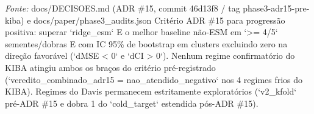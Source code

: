 \begin{table}[htbp]
\begin{tabular}{llllllllllllllllllll}
\bottomrule
\end{tabular}
\begin{flushleft}
\footnotesize \textit{Fonte:} docs/DECISOES.md (ADR \#15, commit 46d13f8 / tag phase3-adr15-pre-kiba) e docs/paper/phase3\_audits.json Critério ADR \#15 para progressão positiva: superar `ridge\_esm` E o melhor baseline não-ESM em `>= 4/5` sementes/dobras E com IC 95\% de bootstrap em clusters excluindo zero na direção favorável (`dMSE < 0` e `dCI > 0`). Nenhum regime confirmatório do KIBA atingiu ambos os braços do critério pré-registrado (`veredito\_combinado\_adr15 = nao\_atendido\_negativo` nos 4 regimes frios do KIBA). Regimes do Davis permanecem estritamente exploratórios (`v2\_kfold` pré-ADR \#15 e dobra 1 do `cold\_target` estendida pós-ADR \#15).
\end{flushleft}
\end{table}

